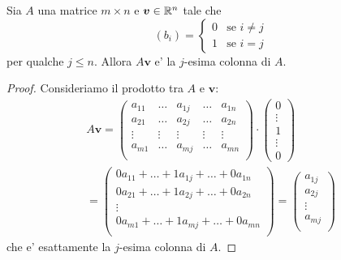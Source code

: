\begin{proposition} \label{j-esima_colonna}
    Sia $A$ una matrice $m \times n$ e $\bm v \in \mathbb{R}^n$ tale che \[(b_i) = \begin{cases}
        0 &\text{se } i \neq j \\
        1 &\text{se } i = j 
    \end{cases}
    \] per qualche $j \leq n$. Allora $A\bm v$ e' la $j$-esima colonna di $A$.
\end{proposition}
\begin{proof}
    Consideriamo il prodotto tra $A$ e $\bm v$: \begin{gather*}
        A\bm v = \begin{pmatrix}
            a_{11}  & \dots   & a_{1j} & \dots  & a_{1n} \\
            a_{21}  & \dots   & a_{2j} & \dots  & a_{2n} \\
            \vdots  & \vdots  & \vdots & \vdots & \vdots \\
            a_{m1}  & \dots   & a_{mj} & \dots  & a_{mn} \\
        \end{pmatrix} \cdot   \begin{pmatrix}
            0 \\ \vdots \\ 1 \\ \vdots \\ 0 
        \end{pmatrix} \\
        = \begin{pmatrix}
            0a_{11}  + \dots   + 1a_{1j} + \dots  + 0a_{1n} \\
            0a_{21}  + \dots   + 1a_{2j} + \dots  + 0a_{2n} \\
            \vdots \\
            0a_{m1}  + \dots   + 1a_{mj} + \dots  + 0a_{mn} \\
        \end{pmatrix} = \begin{pmatrix}
            a_{1j}\\
            a_{2j}\\
            \vdots \\
            a_{mj} \\
        \end{pmatrix}
    \end{gather*}
    che e' esattamente la $j$-esima colonna di $A$.
\end{proof}


